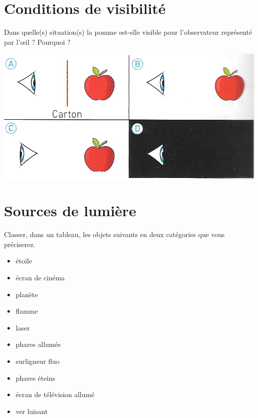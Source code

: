\documentclass[a4paper,11pt]{exam}
\begin{document}
\section{Conditions de visibilité}

Dans quelle(s) situation(s) la pomme est-elle visible pour l'observateur représenté par l'\oe il ? Pourquoi ?


\begin{center}
	\includegraphics[scale=0.5]{vision}
\end{center}

\newpage
\section{Sources de lumière}

Classer, dans un tableau, les objets suivants en deux catégories que vous préciserez.

\begin{multicols}{3}
	\begin{itemize}
		\item étoile
		\item écran de cinéma
		\item planète
		\item flamme
		\item laser
		\item phares allumés
		\item surligneur fluo
		\item phares éteins
		\item écran de télévision allumé
		\item ver luisant
\end{itemize}

\end{multicols}

\end{document}
